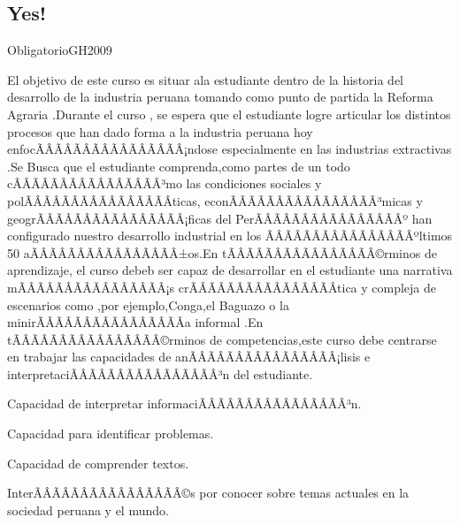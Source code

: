 \begin{syllabus}

\section{Yes!}{Obligatorio}{GH2009}

\begin{justification}
El objetivo de este curso es situar ala estudiante dentro de la historia del desarrollo de la industria peruana tomando como punto de partida la Reforma Agraria .Durante el curso , se espera que el estudiante logre articular los distintos 
procesos que han dado forma a  la industria peruana hoy enfocÃÂÃÂÃÂÃÂÃÂÃÂÃÂÃÂ¡ndose  especialmente en las industrias extractivas .Se Busca que el estudiante  comprenda,como partes de un todo cÃÂÃÂÃÂÃÂÃÂÃÂÃÂÃÂ³mo las condiciones sociales y polÃÂÃÂÃÂÃÂÃÂÃÂÃÂÃÂ­ticas,
econÃÂÃÂÃÂÃÂÃÂÃÂÃÂÃÂ³micas y geogrÃÂÃÂÃÂÃÂÃÂÃÂÃÂÃÂ¡ficas del PerÃÂÃÂÃÂÃÂÃÂÃÂÃÂÃÂº  han configurado nuestro desarrollo industrial en los ÃÂÃÂÃÂÃÂÃÂÃÂÃÂÃÂºltimos 50 aÃÂÃÂÃÂÃÂÃÂÃÂÃÂÃÂ±os.En tÃÂÃÂÃÂÃÂÃÂÃÂÃÂÃÂ©rminos de aprendizaje, el curso debeb ser capaz de desarrollar en el estudiante  una narrativa mÃÂÃÂÃÂÃÂÃÂÃÂÃÂÃÂ¡s crÃÂÃÂÃÂÃÂÃÂÃÂÃÂÃÂ­tica y compleja de escenarios como ,por ejemplo,Conga,el  Baguazo 
o la  minirÃÂÃÂÃÂÃÂÃÂÃÂÃÂÃÂ­a informal .En tÃÂÃÂÃÂÃÂÃÂÃÂÃÂÃÂ©rminos de competencias,este curso debe centrarse en  trabajar las capacidades de anÃÂÃÂÃÂÃÂÃÂÃÂÃÂÃÂ¡lisis e interpretaciÃÂÃÂÃÂÃÂÃÂÃÂÃÂÃÂ³n del estudiante.

\end{justification}

\begin{goals}
\item Capacidad de interpretar informaciÃÂÃÂÃÂÃÂÃÂÃÂÃÂÃÂ³n.
\item Capacidad para identificar problemas.
\item Capacidad de comprender textos.
\item InterÃÂÃÂÃÂÃÂÃÂÃÂÃÂÃÂ©s por conocer sobre temas actuales en la sociedad peruana y el mundo. 
\end{goals}

\begin{outcomes}
    \item {} %
    \item {} %
    \item {} %
    \item {} %
    \item {} %
\end{outcomes}


\end{syllabus}
